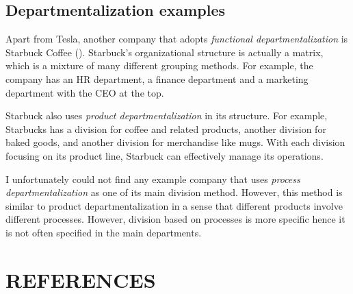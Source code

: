 \documentclass[12pt]{article}
\providecommand\phantomsection{} %
\begin{document}
\subsection{Departmentalization examples}

Apart from Tesla, another company that adopts \textit{functional departmentalization} is Starbuck Coffee (\cite{me17c}). Starbuck's organizational structure is actually a matrix, which is a mixture of many different grouping methods. For example, the company has an HR department, a finance department and a marketing department with the CEO at the top.

Starbuck also uses \textit{product departmentalization} in its structure. For example, Starbucks has a division for coffee and related products, another division for baked goods, and another division for merchandise like mugs. With each division focusing on its product line, Starbuck can effectively manage its operations.

I unfortunately could not find any example company that uses \textit{process departmentalization} as one of its main division method. However, this method is similar to product departmentalization in a sense that different products involve different processes. However, division based on processes is more specific hence it is not often specified in the main departments.



\clearpage

\begingroup 
\linespread{1}

\setlength\bibitemsep{\baselineskip}

\setlength{\bibhang}{0pt}

\section*{REFERENCES}
\phantomsection
{}%

\printbibliography[heading=none]
\endgroup
\end{document}
